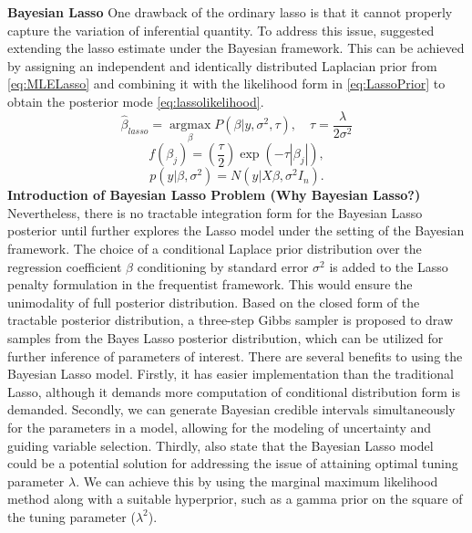 \textbf{Bayesian Lasso}
One drawback of the ordinary lasso is that it cannot properly capture the variation of inferential quantity. To address this issue, \cite{tibshirani_1996} suggested extending the lasso estimate under the Bayesian framework. This can be achieved by assigning an independent and identically distributed Laplacian prior from \autoref{eq:MLELasso} and combining it with the likelihood form in \autoref{eq:LassoPrior} to obtain the posterior mode \autoref{eq:lassolikelihood}. 
\begin{equation}
	\label{eq:MLELasso}
	\hat{\beta}_{lasso} = \underset{\beta}{\operatorname{argmax}}P(\beta|y,\sigma^2,\tau), \quad \tau = \frac{\lambda}{2\sigma^2}
\end{equation}
\begin{equation}
	\label{eq:LassoPrior}
	f(\beta_j) = \left(\frac{\tau}{2}\right) \exp(-\tau|\beta_j|),
\end{equation}
\begin{equation}
	\label{eq:lassolikelihood}
	p(y |\beta,\sigma^2) = N(y|X\beta,\sigma^2I_n).
\end{equation}
\textbf{Introduction of Bayesian Lasso Problem (Why Bayesian Lasso?)}
Nevertheless, there is no tractable integration form for the Bayesian Lasso posterior until \cite{park_casella_2008} further explores the Lasso model under the setting of the Bayesian framework. The choice of a conditional Laplace prior distribution over the regression coefficient $\beta$ conditioning by standard error $\sigma^2$ is added to the Lasso penalty formulation in the frequentist framework. This would ensure the unimodality of full posterior distribution. Based on the closed form of the tractable posterior distribution, a three-step Gibbs sampler is proposed to draw samples from the Bayes Lasso posterior distribution, which can be utilized for further inference of parameters of interest.
There are several benefits to using the Bayesian Lasso model. Firstly, it has easier implementation than the traditional Lasso, although it demands more computation of conditional distribution form is demanded. Secondly, we can generate Bayesian credible intervals simultaneously for the parameters in a model, allowing for the modeling of uncertainty and guiding variable selection.
Thirdly, \cite{park_casella_2008} also state that the Bayesian Lasso model could be a potential solution for addressing the issue of attaining optimal tuning parameter $\lambda$. We can achieve this by using the marginal maximum likelihood method along with a suitable hyperprior, such as a gamma prior on the square of the tuning parameter ($\lambda^2$).
